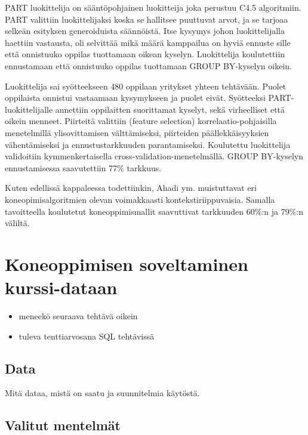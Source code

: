 \documentclass[finnish,twoside,openright]{HYgraduMLDS}
\begin{document}
PART luokittelija on sääntöpohjainen luokitteija joka perustuu C4.5 algoritmiin\cite{Ahadi:2016:SSM:2839509.2844640}. PART valittiin luokittelijaksi koska se hallitsee puuttuvat arvot, ja se tarjoaa selkeän esityksen generoiduista säännöistä. Itse kysymys johon luokittelijalla haettiin vastausta, oli selvittää mikä määrä kamppailua on hyviä ennuste sille että onnistuuko oppilas tuottamaan oikean kyselyn. Luokittelija koulutettiin ennustamaan että onnistuuko oppilas tuottamaan GROUP BY-kyselyn oikein.

Luokittelija sai syötteekseen 480 oppilaan yritykset yhteen tehtävään. Puolet oppilaista onnistui vastaamaan kysymykseen ja puolet eivät. Syötteeksi PART-luokittelijalle annettiin oppilaitten suorittamat kyselyt, sekä virheelliset että oikein menneet. Piirteitä valittiin (feature selection) korrelaatio-pohjaisilla menetelmillä ylisovittamisen välttämiseksi, piirteiden päällekkäisyyksien vähentämiseksi ja ennustustarkkuuden parantamiseksi. Koulutettu luokittelija validoitiin kymmenkertaisella cross-validation-menetelmällä. GROUP BY-kyselyn ennustamisessa saavutettiin 77\% tarkkuus.

Kuten edellissä kappaleessa todettiinkin, Ahadi ym. \cite{Ahadi:2016:SSM:2839509.2844640} muistuttavat eri koneopimisalgoritmien olevan voimakkaasti kontekstiriippuvaisia. Samalla tavoitteella koulutetut koneoppimismallit saavuttivat tarkkuuden 60\%:n ja 79\%:n väliltä.


\chapter{Koneoppimisen soveltaminen kurssi-dataan}

\begin{itemize}
    \item meneekö seuraava tehtävä oikein
    \item tuleva tenttiarvosana SQL tehtävissä
\end{itemize}

\section{Data}

Mitä dataa, mistä on saatu ja suunnitelmia käytöstä.


\section{Valitut mentelmät}
\end{document}

